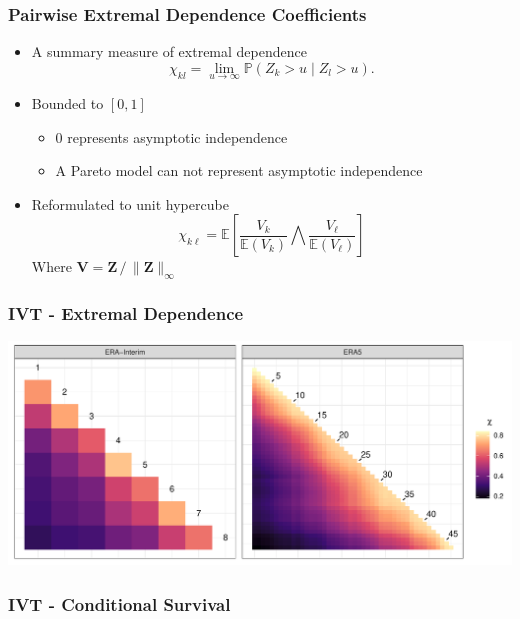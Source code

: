 \documentclass[aspectratio=169,10pt]{beamer}
\begin{document}
\begin{frame}
  \frametitle{Pairwise Extremal Dependence Coefficients}
    \begin{itemize}
      \item A summary measure of extremal dependence
      \begin{equation*}
        \chi_{kl} = \lim\limits_{u\to\infty}\mathbb{P}\left(Z_k > u\mid Z_l > u\right).
      \end{equation*}
      \item Bounded to $[0,1]$
        \begin{itemize}
          \item $0$ represents asymptotic independence
          \item A Pareto model can not represent asymptotic independence
        \end{itemize}
      \item Reformulated to unit hypercube
        \begin{equation*}
          \chi_{k\ell} = \mathbb{E}\left[\frac{V_k}{\mathbb{E}(V_k)}{\bigwedge}\frac{V_{\ell}}{\mathbb{E}(V_{\ell})}\right]
        \end{equation*}
        Where $\bm{V} = \bm{Z}\,/\, \lVert\bm{Z}\rVert_{\infty}$
    \end{itemize}
\end{frame} %

\begin{frame}
  \frametitle{IVT - Extremal Dependence}
  \centering
  \includegraphics[width=0.99\linewidth]{./ch1/images/chi_ij_c}
\end{frame} %

\subsubsection{IVT - Conditional Survival}
\end{document}
